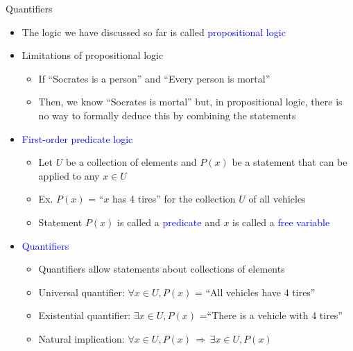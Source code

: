 \documentclass[10pt,english]{beamer}
\begin{document}
\begin{frame}{Quantifiers}

\begin{itemize}
\setlength\itemsep{3mm}
\item<1-> The logic we have discussed so far is called \textcolor{blue}{propositional logic}

\item<1-> Limitations of propositional logic \vspace{1mm}
\begin{itemize}
 \setlength\itemsep{1.5mm}
 \item If ``Socrates is a person'' and ``Every person is mortal''
 \item Then, we know ``Socrates is mortal'' but, in propositional logic, there is no way to formally deduce this by combining the statements 
\end{itemize}

\item<2-> \textcolor{blue}{First-order predicate logic} \vspace{1mm}
\begin{itemize}
 \setlength\itemsep{1.5mm}
 \item Let $U$ be a collection of elements and $P(x)$ be a statement that can be applied to any $x\in U$
 \item Ex. $P(x)$ = ``$x$ has 4 tires'' for the collection $U$ of all vehicles
 \item Statement $P(x)$ is called a \textcolor{blue}{predicate} and $x$ is called a \textcolor{blue}{free variable}
\end{itemize}

\item<3-> \textcolor{blue}{Quantifiers}
\begin{itemize}
 \setlength\itemsep{1.5mm}
 \item Quantifiers allow statements about collections of elements
 \item Universal quantifier: $\forall x\!\in\! U, P(x)$ = ``All vehicles have 4 tires''
 \item Existential quantifier: $\exists x\!\in\! U, P(x)$ =``There is a vehicle with 4 tires''
 \item Natural implication: $\forall x \!\in\!U, P(x) \,\Rightarrow\, \exists x\!\in\! U, P(x)$
\end{itemize}



\end{itemize}

\end{frame}
\end{document}
